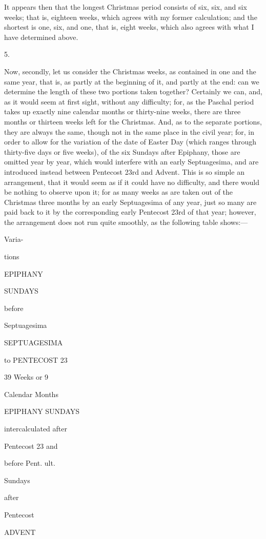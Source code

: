 It appears
then that the longest Christmas period consists of six, six, and six
weeks; that is, eighteen weeks, which agrees with my former calculation;
and the shortest is one, six, and one, that is, eight weeks, which
also agrees with what I have determined above.

5.

Now,
secondly, let us consider the Christmas weeks, as contained in one and
the same year, that is, as partly at the beginning of it, and partly
at the end: can we determine the length of these two portions taken
together? Certainly we can, and, as it would seem at first sight,
without any difficulty; for, as the Paschal period takes up exactly
nine calendar months or thirty-nine weeks, there are three months or
thirteen weeks left for the Christmas. And, as to the separate
portions, they are always the same, though not in the same place in
the civil year; for, in order to allow for the variation of the date
of Easter Day (which ranges through thirty-five days or five weeks),
of the six Sundays after Epiphany, those are omitted year by year,
which would interfere with an early Septuagesima, and are introduced
instead between Pentecost 23rd and Advent. This is so simple an
arrangement, that it would seem as if it could have no
difficulty, and there would be nothing to observe upon it; for as many
weeks as are taken out of the Christmas three months by an early
Septuagesima of any year, just so many are paid back to it by the
corresponding early Pentecost 23rd of that year; however, the
arrangement does not run quite smoothly, as the following table shows:—

Varia-

tions

EPIPHANY

SUNDAYS

before

Septuagesima

SEPTUAGESIMA

to PENTECOST 23

39 Weeks or 9

Calendar Months

EPIPHANY
SUNDAYS

intercalculated after

Pentecost 23 and

before Pent. ult.

Sundays

after

Pentecost

ADVENT

